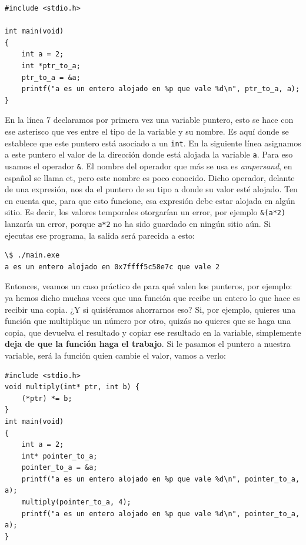 \documentclass[a4paper]{article}
\begin{document}
\noindent
\begin{minipage}[H]{\linewidth}
\mbox{}
\begin{lstlisting}[style=C, label={lst:pointers1},
caption={Declaración de punteros}]
#include <stdio.h>

int main(void)
{
    int a = 2;
    int *ptr_to_a;
    ptr_to_a = &a;
    printf("a es un entero alojado en %p que vale %d\n", ptr_to_a, a);
}
\end{lstlisting}
\end{minipage}


En la línea 7 declaramos por primera vez una variable puntero, esto se hace
con ese asterisco que ves entre el tipo de la variable y su nombre. Es aquí
donde se establece que este puntero está asociado a un \verb!int!. En la
siguiente línea asignamos a este puntero el valor de la dirección donde está
alojada la variable \verb!a!. Para eso usamos el operador \verb!&!.
El nombre del operador que más se usa es \textit{ampersand}, en español se llama
et, pero este nombre es poco conocido.
Dicho operador, delante de
una expresión, nos da el puntero de su tipo a donde su valor esté alojado.
Ten en cuenta que, para que esto funcione, esa expresión debe estar alojada
en algún sitio. Es decir, los valores temporales otorgarían un error, por
ejemplo \verb!&(a*2)! lanzaría un error, porque \verb!a*2! no ha sido guardado
en ningún sitio aún.
Si ejecutas ese programa, la salida será parecida a esto:


\noindent
\begin{minipage}[H]{\linewidth}
\mbox{}
\begin{lstlisting}[style=terminalStyle]
\$ ./main.exe
a es un entero alojado en 0x7ffff5c58e7c que vale 2
\end{lstlisting}
\end{minipage}


Entonces, veamos un caso práctico de para qué valen los punteros, por ejemplo:
ya hemos dicho muchas veces que una función que recibe un entero lo que hace
es recibir una copia. ¿Y si quisiéramos ahorrarnos eso? Si, por ejemplo, quieres
una función que multiplique un número por otro, quizás no quieres que se haga
una copia, que devuelva el resultado y copiar ese resultado en la variable,
simplemente \textbf{deja de que la función haga el trabajo}. Si le pasamos
el puntero a nuestra variable, será la función quien cambie el valor, vamos a
verlo:


\noindent
\begin{minipage}[H]{\linewidth}
\mbox{}
\begin{lstlisting}[style=C, label={lst:pointers1},
caption={Declaración de punteros}]
#include <stdio.h>
void multiply(int* ptr, int b) {
    (*ptr) *= b;
}
int main(void)
{
    int a = 2;
    int* pointer_to_a;
    pointer_to_a = &a;
    printf("a es un entero alojado en %p que vale %d\n", pointer_to_a, a);
    multiply(pointer_to_a, 4);
    printf("a es un entero alojado en %p que vale %d\n", pointer_to_a, a);
}
\end{lstlisting}
\end{minipage}
\end{document}
